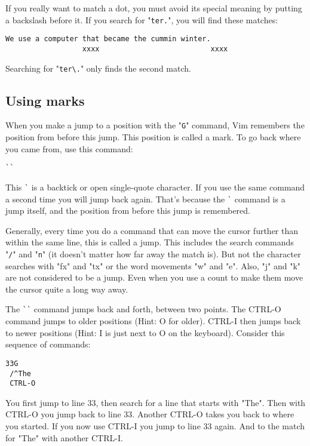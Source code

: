 If you really want to match a dot, you must avoid its special meaning by putting a backslash before it.
If you search for "\verb!ter.!", you will find these matches:

		\begin{Verbatim}[samepage=true]
    We use a computer that became the cummin winter. 
                  xxxx                          xxxx
		\end{Verbatim}

Searching for "\verb!ter\.!" only finds the second match.

\subsection{Using marks}

When you make a jump to a position with the "\verb!G!" command, Vim remembers the position from before this jump.
This position is called a mark.
To go back where you came from, use this command:

 \begin{Verbatim}[samepage=true]
 ``
 \end{Verbatim}

This \verb!`! is a backtick or open single-quote character.
If you use the same command a second time you will jump back again.
That's because the \verb!`! command is a jump itself, and the position from before this jump is remembered.

Generally, every time you do a command that can move the cursor further than within the same line, this is called a jump.
This includes the search commands "\verb!/!" and "\verb!n!" (it doesn't matter how far away the match is).
But not the character searches with "fx" and "tx" or the word movements "w" and "e".
Also, "j" and "k" are not considered to be a jump.
Even when you use a count to make them move the cursor quite a long way away.
 
The \verb!``! command jumps back and forth, between two points.
The CTRL-O command jumps to older positions (Hint: O for older).
CTRL-I then jumps back to newer positions (Hint: I is just next to O on the keyboard).
Consider this sequence of commands:

 \begin{Verbatim}[samepage=true]
 33G
 /^The
 CTRL-O
 \end{Verbatim}

You first jump to line 33, then search for a line that starts with "The".
Then with CTRL-O you jump back to line 33.
Another CTRL-O takes you back to where you started.
If you now use CTRL-I you jump to line 33 again.
And to the match for "The" with another CTRL-I.

